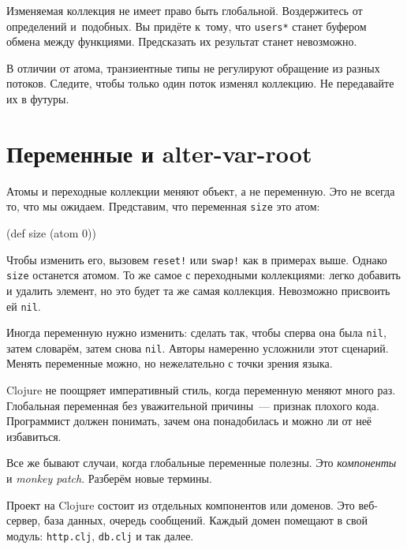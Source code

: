 Изменяемая коллекция не имеет право быть глобальной. Воздержитесь от определений
 и~подобных. Вы придёте к~тому, что
\verb|users*| станет буфером обмена между функциями. Предсказать их результат
станет невозможно.

В отличии от атома, транзиентные типы не регулируют обращение из разных
потоков. Следите, чтобы только один поток изменял коллекцию. Не передавайте их в
футуры.

\section{Переменные и alter-var-root}


\label{alter-var-root}

Атомы и переходные коллекции меняют объект, а не переменную. Это не всегда то,
что мы ожидаем. Представим, что переменная \verb|size| это атом:

\begin{english}
  \begin{clojure}
(def size (atom 0))
  \end{clojure}
\end{english}

Чтобы изменить его, вызовем \verb|reset!| или \verb|swap!| как в примерах
выше. Однако \verb|size| останется атомом. То же самое с переходными
коллекциями: легко добавить и удалить элемент, но это будет та же самая
коллекция. Невозможно присвоить ей \verb|nil|.

Иногда переменную нужно изменить: сделать так, чтобы сперва она была
\verb|nil|, затем словарём, затем снова \verb|nil|. Авторы намеренно
усложнили этот сценарий. Менять переменные можно, но нежелательно с точки зрения
языка.

Clojure не поощряет императивный стиль, когда переменную меняют много
раз. Глобальная переменная без уважительной причины~--- признак плохого кода.
Программист должен понимать, зачем она понадобилась и можно ли от неё
избавиться.


Все же бывают случаи, когда глобальные переменные полезны. Это \emph{компоненты}
и \emph{monkey patch}. Разберём новые термины.

Проект на Clojure состоит из отдельных компонентов или доменов. Это веб-сервер,
база данных, очередь сообщений. Каждый домен помещают в свой модуль:
\verb|http.clj|, \verb|db.clj| и так далее.

